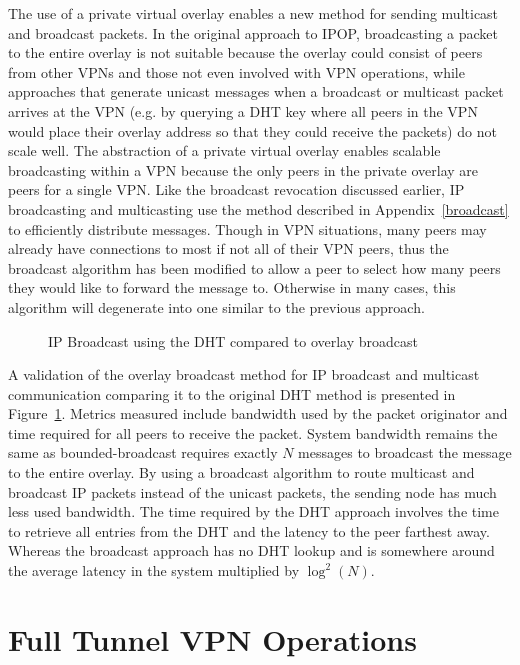 The use of a private virtual overlay enables a new method for sending multicast
and broadcast packets. In the original approach to IPOP, broadcasting a packet
to the entire overlay  is not suitable because the overlay could consist of
peers from other VPNs and those not even involved with VPN operations, while
approaches that generate unicast messages when a broadcast or multicast packet
arrives at the VPN (e.g. by querying a DHT key where all peers in the VPN would
place their overlay address so that they could receive the packets) do not
scale well. The abstraction of a private virtual overlay enables scalable
broadcasting within a VPN because the only peers in the private overlay are
peers for a single VPN.  Like the broadcast revocation discussed earlier, IP
broadcasting and multicasting use the method described in
Appendix~\ref{broadcast} to efficiently distribute messages.  Though in VPN
situations, many peers may already have connections to most if not all of their
VPN peers, thus the broadcast algorithm has been modified to allow a peer to
select how many peers they would like to forward the message to.  Otherwise in
many cases, this algorithm will degenerate into one similar to the previous
approach.  

\begin{figure}
\centering
\caption{IP Broadcast using the DHT compared to overlay broadcast}
\label{fig:ipbroadcast}
\end{figure}

A validation of the overlay broadcast method for IP broadcast and multicast
communication comparing it to the original DHT method is presented in
Figure~\ref{fig:ipbroadcast}.  Metrics measured include bandwidth used by the
packet originator and time required for all peers to receive the packet.
System bandwidth remains the same as bounded-broadcast requires exactly $N$
messages to broadcast the message to the entire overlay.  By using a broadcast
algorithm to route multicast and broadcast IP packets instead of the unicast
packets, the sending node has much less used bandwidth.  The time required by
the DHT approach involves the time to retrieve all entries from the DHT and the
latency to the peer farthest away.  Whereas the broadcast approach has no DHT
lookup and is somewhere around the average latency in the system multiplied by
$\log^2(N)$.

\section{Full Tunnel VPN Operations}
\label{full_tunnel}

